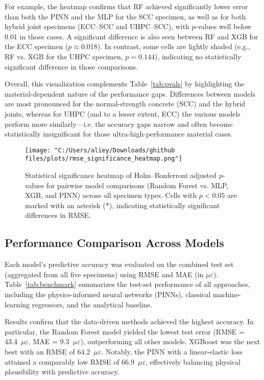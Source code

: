 \documentclass{article}
\begin{document}
For example, the heatmap confirms that RF achieved significantly lower error than both the PINN and the MLP for the SCC specimen, as well as for both hybrid joint specimens (ECC–SCC and UHPC–SCC), with $p$-values well below 0.01 in those cases. A significant difference is also seen between RF and XGB for the ECC specimen ($p \approx 0.018$). In contrast, some cells are lightly shaded (e.g., RF vs. XGB for the UHPC specimen, $p=0.144$), indicating no statistically significant difference in those comparisons. 

Overall, this visualization complements Table~\ref{tab:pvals} by highlighting the material-dependent nature of the performance gaps. Differences between models are most pronounced for the normal-strength concrete (SCC) and the hybrid joints, whereas for UHPC (and to a lesser extent, ECC) the various models perform more similarly—i.e. the accuracy gaps narrow and often become statistically insignificant for those ultra-high-performance material cases.

\begin{figure}[ht]
    \centering
\texttt{[image: "C:/Users/aliey/Downloads/ghithub files/plots/rmse\_significance\_heatmap.png"]}
    \caption{Statistical significance heatmap of Holm--Bonferroni adjusted $p$-values for pairwise model comparisons (Random Forest vs. MLP, XGB, and PINN) across all specimen types. Cells with $p < 0.05$ are marked with an asterisk (*), indicating statistically significant differences in RMSE.}
    \label{fig:rmse_heatmap}
\end{figure}

\subsection{Performance Comparison Across Models}
\label{sec:performance_comparison_results}

Each model’s predictive accuracy was evaluated on the combined test set (aggregated from all five specimens) using RMSE and MAE (in $\mu\varepsilon$). Table~\ref{tab:benchmark} summarizes the test-set performance of all approaches, including the physics-informed neural networks (PINNs), classical machine-learning regressors, and the analytical baseline.

Results confirm that the data-driven methods achieved the highest accuracy. In particular, the Random Forest model yielded the lowest test error (RMSE = 43.4~$\mu\varepsilon$, MAE = 9.3~$\mu\varepsilon$), outperforming all other models. XGBoost was the next best with an RMSE of 64.2~$\mu\varepsilon$. Notably, the PINN with a linear-elastic loss attained a comparably low RMSE of 66.9~$\mu\varepsilon$, effectively balancing physical plausibility with predictive accuracy.
\end{document}

